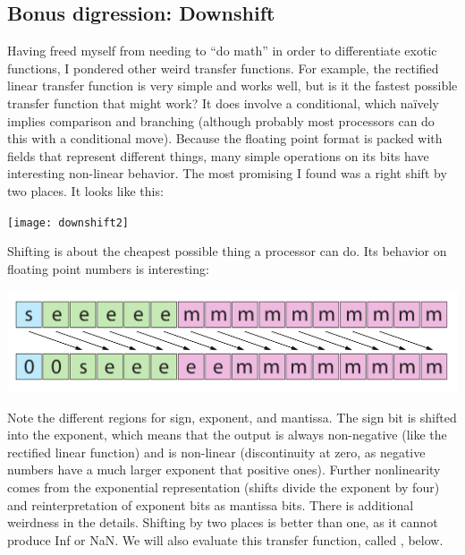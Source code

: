 \documentclass[twocolumn]{article}
\begin{document}
\subsection{Bonus digression: Downshift}
Having freed myself from needing to ``do math'' in order to
differentiate exotic functions, I pondered other weird transfer
functions. For example, the rectified linear transfer function is very
simple and works well, but is it the fastest possible transfer
function that might work? It does involve a conditional, which na\"ively
implies comparison and branching (although probably most processors
can do this with a conditional move). Because the floating point
format is packed with fields that represent different things, many
simple operations on its bits have interesting non-linear behavior.
The most promising I found was a right shift by two places. It looks
like this:

\begin{center}
\texttt{[image: downshift2]}
\end{center}


Shifting is about the cheapest possible thing a processor can do. Its
behavior on floating point numbers is interesting:

\includegraphics[width=0.9 \linewidth]{downshiftbits}

Note the different regions for sign, exponent, and mantissa.
The sign bit is shifted into the exponent, which means that the output
is always non-negative (like the rectified linear function) and is
non-linear (discontinuity at zero, as negative numbers have a much
larger exponent that positive ones). Further nonlinearity comes from
the exponential representation (shifts divide the exponent by four)
and reinterpretation of exponent bits as mantissa bits. There is
additional weirdness in the details. Shifting by two places is better
than one, as it cannot produce Inf or NaN.
We will also evaluate this transfer function, called \downshifttwo,
below.
\end{document}
